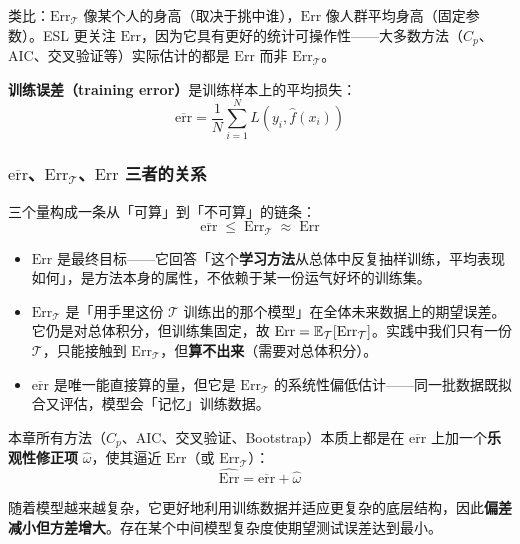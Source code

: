 类比：$\mathrm{Err}_{\mathcal{T}}$ 像某个人的身高（取决于挑中谁），$\mathrm{Err}$ 像人群平均身高（固定参数）。ESL 更关注 $\mathrm{Err}$，因为它具有更好的统计可操作性——大多数方法（$C_p$、AIC、交叉验证等）实际估计的都是 $\mathrm{Err}$ 而非 $\mathrm{Err}_{\mathcal{T}}$。

\textbf{训练误差（training error）}是训练样本上的平均损失：
\begin{equation}\label{eq:err}
    \overline{\mathrm{err}} = \frac{1}{N}\sum_{i=1}^{N} L(y_i, \hat{f}(x_i))
\end{equation}

\subsubsection{$\overline{\mathrm{err}}$、$\mathrm{Err}_{\mathcal{T}}$、$\mathrm{Err}$ 三者的关系}

三个量构成一条从「可算」到「不可算」的链条：
\begin{equation}\label{eq:err_chain}
    \overline{\mathrm{err}} \;\le\; \mathrm{Err}_{\mathcal{T}} \;\approx\; \mathrm{Err}
\end{equation}

\begin{itemize}
    \item $\mathrm{Err}$ 是最终目标——它回答「这个\textbf{学习方法}从总体中反复抽样训练，平均表现如何」，是方法本身的属性，不依赖于某一份运气好坏的训练集。
    \item $\mathrm{Err}_{\mathcal{T}}$ 是「用手里这份 $\mathcal{T}$ 训练出的那个模型」在全体未来数据上的期望误差。它仍是对总体积分，但训练集固定，故 $\mathrm{Err} = \mathbb{E}_{\mathcal{T}}[\mathrm{Err}_{\mathcal{T}}]$。实践中我们只有一份 $\mathcal{T}$，只能接触到 $\mathrm{Err}_{\mathcal{T}}$，但\textbf{算不出来}（需要对总体积分）。
    \item $\overline{\mathrm{err}}$ 是唯一能直接算的量，但它是 $\mathrm{Err}_{\mathcal{T}}$ 的系统性偏低估计——同一批数据既拟合又评估，模型会「记忆」训练数据。
\end{itemize}

本章所有方法（$C_p$、AIC、交叉验证、Bootstrap）本质上都是在 $\overline{\mathrm{err}}$ 上加一个\textbf{乐观性修正项} $\hat{\omega}$，使其逼近 $\mathrm{Err}$（或 $\mathrm{Err}_{\mathcal{T}}$）：
\begin{equation}\label{eq:err_hat}
    \widehat{\mathrm{Err}} = \overline{\mathrm{err}} + \hat{\omega}
\end{equation}

随着模型越来越复杂，它更好地利用训练数据并适应更复杂的底层结构，因此\textbf{偏差减小但方差增大}。存在某个中间模型复杂度使期望测试误差达到最小。

